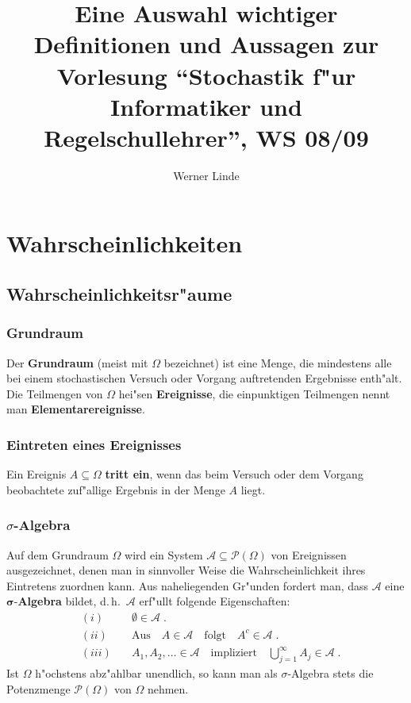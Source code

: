 \documentclass[ngerman,draft,parskip=half,twoside]{scrartcl}
\newcommand*{\Algeb}{\mathcal{A}}   %
\newcommand*{\PotM}{\mathcal{P}}    %
\begin{document}
\renewcommand{\labelenumi}{\arabic{enumi}.}
\renewcommand{\labelenumii}{\arabic{enumi}.\arabic{enumii}}


\title{Eine Auswahl wichtiger Definitionen und Aussagen
 zur Vorlesung
  \enquote{Stochastik f"ur Informatiker und Regelschullehrer}, WS 08/09}

\author{Werner Linde}
\maketitle

\section{Wahrscheinlichkeiten}
\subsection{Wahrscheinlichkeitsr"aume}

\subsubsection{Grundraum}
Der \textbf{Grundraum} (meist mit $\Omega$ bezeichnet) ist eine Menge,
die mindestens alle bei einem stochastischen Versuch oder Vorgang
auftretenden Ergebnisse enth"alt. Die Teilmengen von $\Omega$ hei"sen \textbf{Ereignisse},
die einpunktigen Teilmengen nennt man \textbf{Elementarereignisse}.

\subsubsection{Eintreten eines Ereignisses}
Ein Ereignis $A\subseteq \Omega$ \textbf{tritt ein}, wenn das beim Versuch oder dem Vorgang
beobachtete zuf"allige Ergebnis in der Menge
$A$ liegt.

\subsubsection{$\sigma$-Algebra}
Auf dem Grundraum $\Omega$ wird ein System $\Algeb\subseteq \PotM(\Omega)$  von Ereignissen
ausgezeichnet, denen man in sinnvoller Weise die
Wahrscheinlichkeit ihres Eintretens zuordnen kann. Aus naheliegenden Gr"unden fordert man,
dass $\Algeb$ eine $\mathbf \sigma$-\textbf{Algebra} bildet, d.\,h.~$\Algeb$ erf"ullt
folgende Eigenschaften:
\begin{eqnarray*}
&(i)&\quad\emptyset\in\Algeb\;.\\
&(ii)&\quad\mbox{Aus}\quad A\in\Algeb\quad\mbox{folgt}\quad A^c\in \Algeb\;.\\
&(iii)&\quad
A_1,A_2,\ldots\in \Algeb \quad \mbox{impliziert}\quad \bigcup_{j=1}^\infty A_j\in\Algeb\;.
\end{eqnarray*}
Ist $\Omega$ h"ochstens abz"ahlbar unendlich, so kann man als $\sigma$-Algebra stets die
Potenzmenge $\PotM(\Omega)$ von $\Omega$ nehmen.
\end{document}
